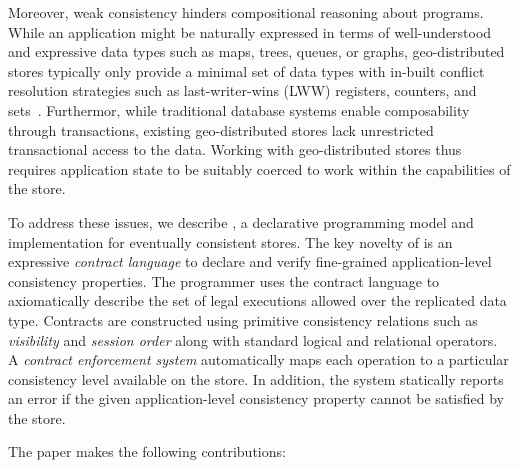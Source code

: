 Moreover, weak consistency hinders compositional reasoning about programs.
While an application might be naturally expressed in terms of well-understood
and expressive data types such as maps, trees, queues, or graphs,
geo-distributed stores typically only provide a minimal set of data types with
in-built conflict resolution strategies such as last-writer-wins (LWW)
registers, counters, and sets~\cite{Cassandra,DynamoDB}.  Furthermor, while
traditional database systems enable composability through transactions,
existing geo-distributed stores lack unrestricted transactional access to the
data.  Working with geo-distributed stores thus requires application state to
be suitably coerced to work within the capabilities of the store.

To address these issues, we describe \name, a declarative programming model and
implementation for eventually consistent stores. The key novelty of \name is an
expressive \emph{contract language} to declare and verify fine-grained
application-level consistency properties. The programmer uses the contract
language to axiomatically describe the set of legal executions allowed over the
replicated data type. Contracts are constructed using primitive consistency
relations such as \emph{visibility} and \emph{session order} along with
standard logical and relational operators. A \emph{contract enforcement system}
automatically maps each operation to a particular consistency level available
on the store. In addition, the system statically reports an error if the given
application-level consistency property cannot be satisfied by the store.

The paper makes the following contributions:

